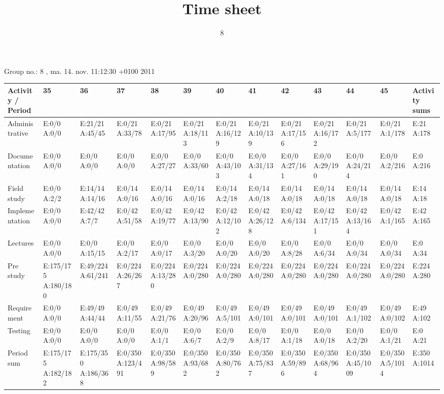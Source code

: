 \documentclass[a4paper]{article}
\title{Time sheet}
\author{8}
\begin{document}
\begin{landscape}
\begin{center}
	Group no.: 8
	, ma. 14. nov. 11:12:30 +0100 2011

	\begin{tabular}{| l | l | l | l | l | l | l | l | l | l | l | l | l |}
		\hline
		Activity / Period & 35 & 36 & 37 & 38 & 39 & 40 & 41 & 42 & 43 & 44 & 45 & Activity sums \\
		\hline \hline
		
Administrative & E:0/0 A:0/0 & E:21/21 A:45/45 & E:0/21 A:33/78 & E:0/21 A:17/95 & E:0/21 A:18/113 & E:0/21 A:16/129 & E:0/21 A:10/139 & E:0/21 A:17/156 & E:0/21 A:16/172 & E:0/21 A:5/177 & E:0/21 A:1/178 & E:21 A:178 \\
Documentation & E:0/0 A:0/0 & E:0/0 A:0/0 & E:0/0 A:0/0 & E:0/0 A:27/27 & E:0/0 A:33/60 & E:0/0 A:43/103 & E:0/0 A:31/134 & E:0/0 A:27/161 & E:0/0 A:29/190 & E:0/0 A:24/214 & E:0/0 A:2/216 & E:0 A:216 \\
Field study & E:0/0 A:2/2 & E:14/14 A:14/16 & E:0/14 A:0/16 & E:0/14 A:0/16 & E:0/14 A:0/16 & E:0/14 A:2/18 & E:0/14 A:0/18 & E:0/14 A:0/18 & E:0/14 A:0/18 & E:0/14 A:0/18 & E:0/14 A:0/18 & E:14 A:18 \\
Implementation & E:0/0 A:0/0 & E:42/42 A:7/7 & E:0/42 A:51/58 & E:0/42 A:19/77 & E:0/42 A:13/90 & E:0/42 A:12/102 & E:0/42 A:26/128 & E:0/42 A:6/134 & E:0/42 A:17/151 & E:0/42 A:13/164 & E:0/42 A:1/165 & E:42 A:165 \\
Lectures & E:0/0 A:0/0 & E:0/0 A:15/15 & E:0/0 A:2/17 & E:0/0 A:0/17 & E:0/0 A:3/20 & E:0/0 A:0/20 & E:0/0 A:0/20 & E:0/0 A:8/28 & E:0/0 A:6/34 & E:0/0 A:0/34 & E:0/0 A:0/34 & E:0 A:34 \\
Pre study & E:175/175 A:180/180 & E:49/224 A:61/241 & E:0/224 A:26/267 & E:0/224 A:13/280 & E:0/224 A:0/280 & E:0/224 A:0/280 & E:0/224 A:0/280 & E:0/224 A:0/280 & E:0/224 A:0/280 & E:0/224 A:0/280 & E:0/224 A:0/280 & E:224 A:280 \\
Requirement & E:0/0 A:0/0 & E:49/49 A:44/44 & E:0/49 A:11/55 & E:0/49 A:21/76 & E:0/49 A:20/96 & E:0/49 A:5/101 & E:0/49 A:0/101 & E:0/49 A:0/101 & E:0/49 A:0/101 & E:0/49 A:1/102 & E:0/49 A:0/102 & E:49 A:102 \\
Testing & E:0/0 A:0/0 & E:0/0 A:0/0 & E:0/0 A:0/0 & E:0/0 A:1/1 & E:0/0 A:6/7 & E:0/0 A:2/9 & E:0/0 A:8/17 & E:0/0 A:1/18 & E:0/0 A:0/18 & E:0/0 A:2/20 & E:0/0 A:1/21 & E:0 A:21 \\
Period sum & E:175/175 A:182/182 & E:175/350 A:186/368 & E:0/350 A:123/491 & E:0/350 A:98/589 & E:0/350 A:93/682 & E:0/350 A:80/762 & E:0/350 A:75/837 & E:0/350 A:59/896 & E:0/350 A:68/964 & E:0/350 A:45/1009 & E:0/350 A:5/1014 & E:350 A:1014 \\
		\hline
	\end{tabular}
\end{center}
\end{landscape}
\end{document}
